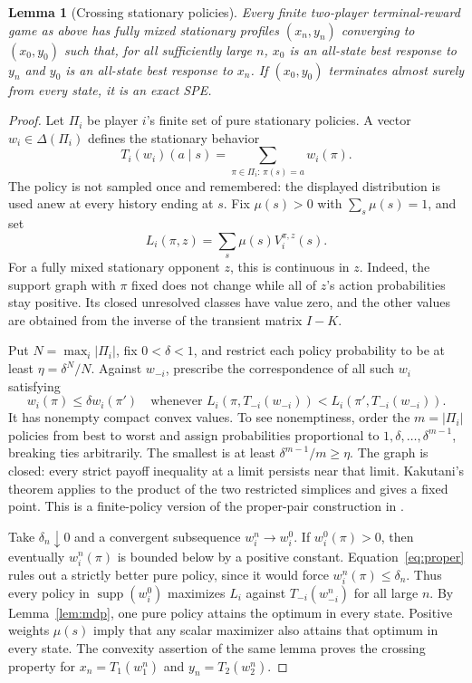 \documentclass[11pt]{article}
\newtheorem{lemma}[theorem]{Lemma}
\newcommand{\supp}{\operatorname{supp}}
\begin{document}
\begin{lemma}[Crossing stationary policies]\label{lem:cross}
Every finite two-player terminal-reward game as above has fully mixed
stationary profiles $(x_n,y_n)$ converging to $(x_0,y_0)$ such that, for
all sufficiently large $n$, $x_0$ is an all-state best response to $y_n$
and $y_0$ is an all-state best response to $x_n$.
If $(x_0,y_0)$ terminates almost surely from every state, it is an exact SPE.
\end{lemma}
\begin{proof}
Let $\Pi_i$ be player $i$'s finite set of pure stationary policies. A vector
$w_i\in\Delta(\Pi_i)$ defines the stationary behavior
\[
 T_i(w_i)(a\mid s)=\sum_{\pi\in\Pi_i:\,\pi(s)=a}w_i(\pi).
\]
The policy is not sampled once and remembered: the displayed distribution
is used anew at every history ending at $s$.
Fix $\mu(s)>0$ with $\sum_s\mu(s)=1$, and set
\[
 L_i(\pi,z)=\sum_s\mu(s)V_i^{\pi,z}(s).
\]
For a fully mixed stationary opponent $z$, this is continuous in $z$.
Indeed, the support graph with $\pi$ fixed does not change while all of
$z$'s action probabilities stay positive. Its closed unresolved classes
have value zero, and the other values are obtained from the inverse of
the transient matrix $I-K$.

Put $N=\max_i|\Pi_i|$, fix $0<\delta<1$, and restrict each policy
probability to be at least $\eta=\delta^N/N$.
Against $w_{-i}$, prescribe the correspondence of all such $w_i$ satisfying
\begin{equation}\label{eq:proper}
 w_i(\pi)\leq\delta w_i(\pi')
 \quad\text{whenever }L_i(\pi,T_{-i}(w_{-i}))
                  <L_i(\pi',T_{-i}(w_{-i})).
\end{equation}
It has nonempty compact convex values. To see nonemptiness, order the
$m=|\Pi_i|$ policies from best to worst and assign probabilities
proportional to $1,\delta,\ldots,\delta^{m-1}$, breaking ties arbitrarily.
The smallest is at least $\delta^{m-1}/m\geq\eta$.
The graph is closed: every strict payoff inequality at a limit persists
near that limit. Kakutani's theorem \cite[p.~458]{Kakutani} applies to the
product of the two restricted simplices and gives a fixed point.
This is a finite-policy version of the proper-pair construction in
\cite[Definition 2.3 and Theorem 2.4]{FTV}.

Take $\delta_n\downarrow0$ and a convergent subsequence
$w_i^n\to w_i^0$. If $w_i^0(\pi)>0$, then eventually $w_i^n(\pi)$ is
bounded below by a positive constant. Equation~\eqref{eq:proper} rules
out a strictly better pure policy, since it would force
$w_i^n(\pi)\leq\delta_n$. Thus every policy in $\supp(w_i^0)$ maximizes
$L_i$ against $T_{-i}(w_{-i}^n)$ for all large $n$.
By Lemma~\ref{lem:mdp}, one pure policy attains the optimum in every
state. Positive weights $\mu(s)$ imply that any scalar maximizer also
attains that optimum in every state. The convexity assertion of the
same lemma proves the crossing property for
$x_n=T_1(w_1^n)$ and $y_n=T_2(w_2^n)$.


\end{proof}
\end{document}
